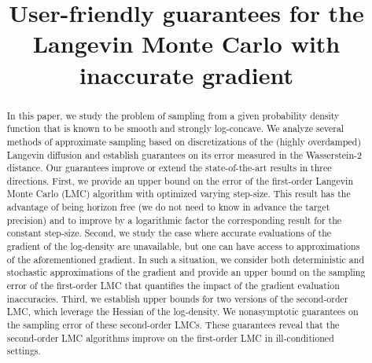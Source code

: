 \documentclass[aoap,preprint,reqno,a4paper]{imsart} %
\begin{document}
\begin{frontmatter}

\title{User-friendly guarantees for the Langevin Monte Carlo with inaccurate gradient}

\begin{aug}
\author{ }
\author{ \ead[label=e3]{}}




\address{3 avenue Pierre Larousse,
92245 Malakoff, France.}
\end{aug}

\begin{abstract}
In this paper, we study the problem of sampling from a given probability density
function that is known to be smooth and strongly log-concave. We analyze several
methods of approximate sampling based on discretizations of the (highly overdamped) 
Langevin diffusion and establish guarantees on its error measured in the
Wasserstein-2 distance. Our guarantees improve or extend the state-of-the-art
results in three directions. First, we provide an upper bound on the error of the
first-order Langevin Monte Carlo (LMC) algorithm with optimized varying step-size.
This result has the advantage of being horizon free (we do not need to know in
advance the target precision) and to improve by a logarithmic factor the
corresponding result for the constant step-size. Second, we study the case where
accurate evaluations of the gradient of the log-density are unavailable, but one 
can have access to approximations of the aforementioned gradient. In such a situation,
we consider both deterministic and stochastic approximations of the gradient and
provide an upper bound on the sampling error of the first-order LMC that quantifies
the impact of the gradient evaluation inaccuracies. Third, we establish upper bounds
for two versions of the second-order LMC, which leverage the Hessian of the
log-density. We nonasymptotic guarantees on the sampling error of these second-order 
LMCs. These guarantees reveal that the second-order LMC algorithms improve on the
first-order LMC in ill-conditioned settings.
\end{abstract}

\begin{keyword}[class=MSC]
\end{keyword}

\begin{keyword}
\end{keyword}

\end{frontmatter}
\end{document}
